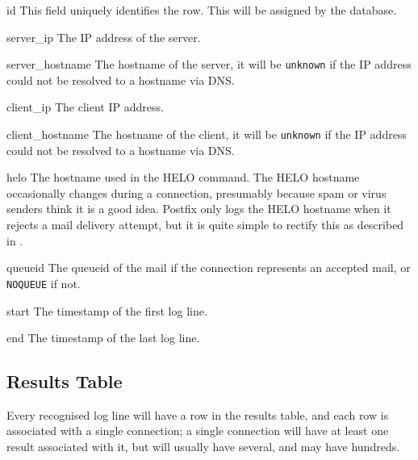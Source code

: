 \begin{boldeqlist}

    \item [id] This field uniquely identifies the row.  This will be
        assigned by the database.

    \item [server\_ip] The IP address of the server.

    \item [server\_hostname] The hostname of the server, it will be
        \texttt{unknown} if the IP address could not be resolved to a
        hostname via DNS\@.

    \item [client\_ip] The client IP address.

    \item [client\_hostname] The hostname of the client, it will be
        \texttt{unknown} if the IP address could not be resolved to a
        hostname via DNS\@.

    \item [helo] The hostname used in the HELO command.  The HELO hostname
        occasionally changes during a connection, presumably because spam
        or virus senders think it is a good idea.  Postfix only logs the
        HELO hostname when it rejects a mail delivery attempt, but it is
        quite simple to rectify this as described in .

    \item [queueid] The queueid of the mail if the connection represents an
        accepted mail, or \texttt{NOQUEUE} if not.

    \item [start] The timestamp of the first log line.

    \item [end] The timestamp of the last log line.

\end{boldeqlist}

\subsection{Results Table}

\label{results table}

Every recognised log line will have a row in the results table, and each
row is associated with a single connection; a single connection will have
at least one result associated with it, but will usually have several, and
may have hundreds.

